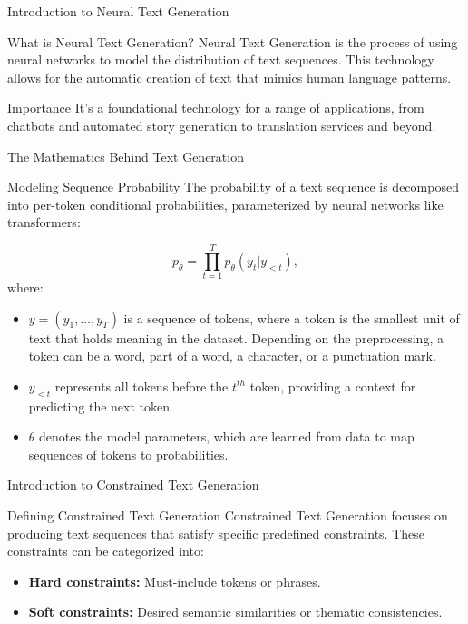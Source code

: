 \documentclass{beamer}
\begin{document}
\begin{frame}{Introduction to Neural Text Generation}
    \begin{block}{What is Neural Text Generation?}
        Neural Text Generation is the process of using neural networks to model the distribution of text sequences. This technology allows for the automatic creation of text that mimics human language patterns.
    \end{block}
    \begin{block}{Importance}
        It's a foundational technology for a range of applications, from chatbots and automated story generation to translation services and beyond.
    \end{block}
\end{frame}

\begin{frame}{The Mathematics Behind Text Generation}
    \begin{block}{Modeling Sequence Probability}
        The probability of a text sequence is decomposed into per-token conditional probabilities, parameterized by neural networks like transformers:
    \end{block}
    \begin{equation}
        p_{\theta} = \prod_{t=1}^{T} p_{\theta} (y_t | y_{<t}),
    \end{equation}
    where:
    \begin{itemize}
        \item $y = (y_1, \ldots, y_T)$ is a sequence of tokens, where a token is the smallest unit of text that holds meaning in the dataset. Depending on the preprocessing, a token can be a word, part of a word, a character, or a punctuation mark.
        \item $y_{<t}$ represents all tokens before the $t^{th}$ token, providing a context for predicting the next token.
        \item $\theta$ denotes the model parameters, which are learned from data to map sequences of tokens to probabilities.
    \end{itemize}
\end{frame}

\begin{frame}{Introduction to Constrained Text Generation}
    \begin{block}{Defining Constrained Text Generation}
        Constrained Text Generation focuses on producing text sequences that satisfy specific predefined constraints. These constraints can be categorized into:
    \end{block}
    \begin{itemize}
        \item \textbf{Hard constraints:} Must-include tokens or phrases.
        \item \textbf{Soft constraints:} Desired semantic similarities or thematic consistencies.
    \end{itemize}
\end{frame}
\end{document}
